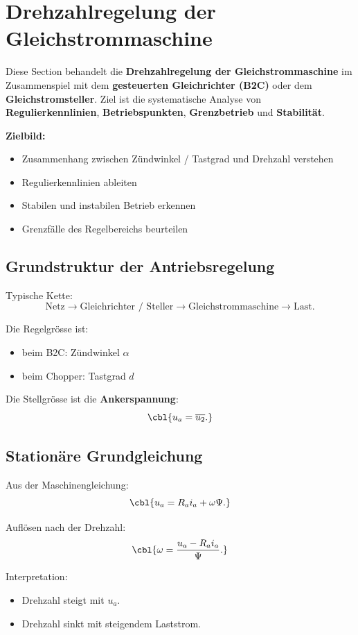 \section{Drehzahlregelung der Gleichstrommaschine}

Diese Section behandelt die \textbf{Drehzahlregelung der Gleichstrommaschine}
im Zusammenspiel mit dem \textbf{gesteuerten Gleichrichter (B2C)} oder dem \textbf{Gleichstromsteller}.
Ziel ist die systematische Analyse von \textbf{Regulierkennlinien}, \textbf{Betriebspunkten},
\textbf{Grenzbetrieb} und \textbf{Stabilität}.

\smallskip

\textbf{Zielbild:}
\begin{itemize}
    \item Zusammenhang zwischen Zündwinkel / Tastgrad und Drehzahl verstehen
    \item Regulierkennlinien ableiten
    \item Stabilen und instabilen Betrieb erkennen
    \item Grenzfälle des Regelbereichs beurteilen
\end{itemize}

\subsection{Grundstruktur der Antriebsregelung}

Typische Kette:
\[
\text{Netz} \rightarrow \text{Gleichrichter / Steller} \rightarrow \text{Gleichstrommaschine} \rightarrow \text{Last}.
\]

Die Regelgrösse ist:
\begin{itemize}
    \item beim B2C: Zündwinkel $\alpha$  
    \item beim Chopper: Tastgrad $d$
\end{itemize}

Die Stellgrösse ist die \textbf{Ankerspannung}:
\[
\cbl{u_a = \overline{u_2}.}
\]

\subsection{Stationäre Grundgleichung}

Aus der Maschinengleichung:
\[
\cbl{u_a = R_a i_a + \omega \Psi.}
\]

Auflösen nach der Drehzahl:
\[
\cbl{\omega = \frac{u_a - R_a i_a}{\Psi}.}
\]

Interpretation:
\begin{itemize}
    \item Drehzahl steigt mit $u_a$.
    \item Drehzahl sinkt mit steigendem Laststrom.
\end{itemize}

